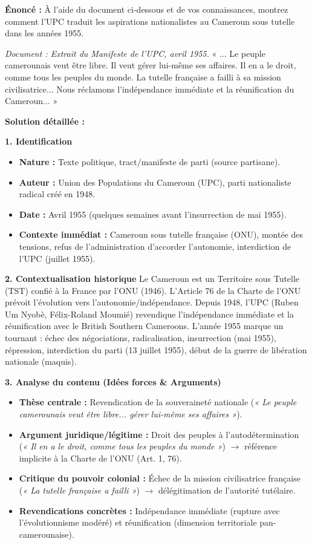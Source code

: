 \documentclass[11pt]{article}
\newcommand{\cle}[1]{{\popxbold\color{popdark}#1}}
\begin{document}
\begin{exoresolu}
\textbf{Énoncé :} À l'aide du document ci-dessous et de vos connaissances, montrez comment l'UPC traduit les aspirations nationalistes au Cameroun sous tutelle dans les années 1955.

\textit{Document : Extrait du Manifeste de l'UPC, avril 1955.}
« ... Le peuple camerounais veut être libre. Il veut gérer lui-même ses affaires. Il en a le droit, comme tous les peuples du monde. La tutelle française a failli à sa mission civilisatrice... Nous réclamons l'indépendance immédiate et la réunification du Cameroun... »

\tcblower
\textbf{Solution détaillée :}

\textbf{1. Identification}
\begin{itemize}
    \item \textbf{Nature :} Texte politique, tract/manifeste de parti (source partisane).
    \item \textbf{Auteur :} Union des Populations du Cameroun (UPC), parti nationaliste radical créé en 1948.
    \item \textbf{Date :} Avril 1955 (quelques semaines avant l'insurrection de mai 1955).
    \item \textbf{Contexte immédiat :} Cameroun sous tutelle française (ONU), montée des tensions, refus de l'administration d'accorder l'autonomie, interdiction de l'UPC (juillet 1955).
\end{itemize}

\textbf{2. Contextualisation historique}
Le Cameroun est un Territoire sous Tutelle (TST) confié à la France par l'ONU (1946). L'Article 76 de la Charte de l'ONU prévoit l'évolution vers l'autonomie/indépendance. Depuis 1948, l'UPC (Ruben Um Nyobè, Félix-Roland Moumié) revendique l'indépendance immédiate et la réunification avec le British Southern Cameroons. L'année 1955 marque un tournant : échec des négociations, radicalisation, insurrection (mai 1955), répression, interdiction du parti (13 juillet 1955), début de la guerre de libération nationale (maquis).

\textbf{3. Analyse du contenu (Idées forces \& Arguments)}
\begin{itemize}
    \item \textbf{Thèse centrale :} Revendication de la \cle{souveraineté nationale} (\textit{« Le peuple camerounais veut être libre... gérer lui-même ses affaires »}).
    \item \textbf{Argument juridique/légitime :} Droit des peuples à l'autodétermination (\textit{« Il en a le droit, comme tous les peuples du monde »}) $\rightarrow$ référence implicite à la Charte de l'ONU (Art. 1, 76).
    \item \textbf{Critique du pouvoir colonial :} Échec de la \cle{mission civilisatrice} française (\textit{« La tutelle française a failli »}) $\rightarrow$ délégitimation de l'autorité tutélaire.
    \item \textbf{Revendications concrètes :} \cle{Indépendance immédiate} (rupture avec l'évolutionnisme modéré) et \cle{réunification} (dimension territoriale pan-camerounaise).
\end{itemize}


\end{exoresolu}
\end{document}
